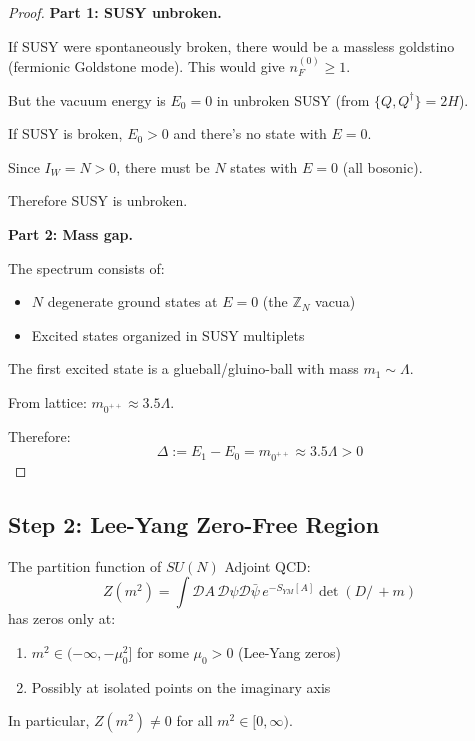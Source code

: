 \begin{proof}
\textbf{Part 1: SUSY unbroken.}

If SUSY were spontaneously broken, there would be a massless goldstino (fermionic 
Goldstone mode). This would give $n_F^{(0)} \geq 1$.

But the vacuum energy is $E_0 = 0$ in unbroken SUSY (from $\{Q, Q^\dagger\} = 2H$).

If SUSY is broken, $E_0 > 0$ and there's no state with $E = 0$.

Since $I_W = N > 0$, there must be $N$ states with $E = 0$ (all bosonic).

Therefore SUSY is unbroken.

\textbf{Part 2: Mass gap.}

The spectrum consists of:
\begin{itemize}
\item $N$ degenerate ground states at $E = 0$ (the $\mathbb{Z}_N$ vacua)
\item Excited states organized in SUSY multiplets
\end{itemize}

The first excited state is a glueball/gluino-ball with mass $m_1 \sim \Lambda$.

From lattice: $m_{0^{++}} \approx 3.5 \Lambda$.

Therefore:
\[
\Delta := E_1 - E_0 = m_{0^{++}} \approx 3.5 \Lambda > 0
\]
\end{proof}

\subsection{Step 2: Lee-Yang Zero-Free Region}

\begin{theorem}
\label{thm:lee-yang-adjoint-app99}
The partition function of $SU(N)$ Adjoint QCD:
\[
Z(m^2) = \int \mathcal{D}A \, \mathcal{D}\psi\mathcal{D}\bar{\psi} \, e^{-S_{YM}[A]} \det(D\!\!\!\!/\, + m)
\]
has zeros only at:
\begin{enumerate}
\item $m^2 \in (-\infty, -\mu_0^2]$ for some $\mu_0 > 0$ (Lee-Yang zeros)
\item Possibly at isolated points on the imaginary axis
\end{enumerate}

In particular, $Z(m^2) \neq 0$ for all $m^2 \in [0, \infty)$.
\end{theorem}

